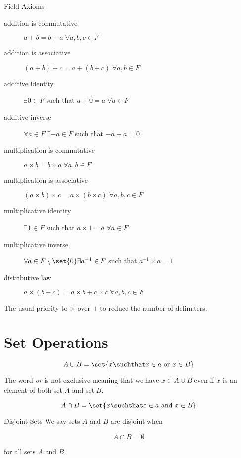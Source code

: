 \documentclass[20150903-160354-rs2.2-MarksMathNotebook.tex]{subfiles}
\begin{document}
Field Axioms

\begin{description}
\item[addition is commutative] $a+b=b+a \; \forall a,b,c \in F$
\item[addition is associative] $(a+b)+c = a+(b+c) \; \forall a,b \in F$
\item[additive identity] $\exists 0 \in F$ such that $a+0=a \; \forall a \in F$
\item[additive inverse] $\forall a \in F \; \exists -a \in F$ such that $-a+a=0$
\item[multiplication is commutative] $a\times b=b\times a \; \forall a,b \in F$
\item[multiplication is associative] $(a\times b) \times c = a\times (b \times c) \; \forall a,b,c \in F$
\item[multiplicative identity] $\exists 1 \in F$ such that $a \times 1 = a \; \forall a \in F$
\item[multiplicative inverse] $\forall a \in F \setminus \set{0} \exists a^{-1} \in F$ such that $a^{-1} \times a = 1$
\item[distributive law] $a \times (b +c) = a \times b + a \times c \; \forall a, b, c \in F$
\end{description}

The usual priority to $\times$ over $+$ to reduce the number of delimiters.

\section{Set Operations}

\begin{definition}[Union]
\[
A \cup B = \set{x \suchthat x \in a \text{ or } x \in B }
\]
\end{definition}

\begin{remark}
The word \textit{or} is not exclusive meaning that we have $x \in A \cup B$ even if $x$ is an element of both set $A$ and set $B$.
\end{remark}

\begin{definition}[Intersection]
\[
A \cap B = \set{x \suchthat x \in a \text{ and } x \in B}
\]
\end{definition}

\begin{definition}{Disjoint Sets}
We say sets $A$ and $B$ are disjoint when

\[
A \cap B = \emptyset
\]

for all sets $A$ and $B$
\end{definition}
\end{document}
